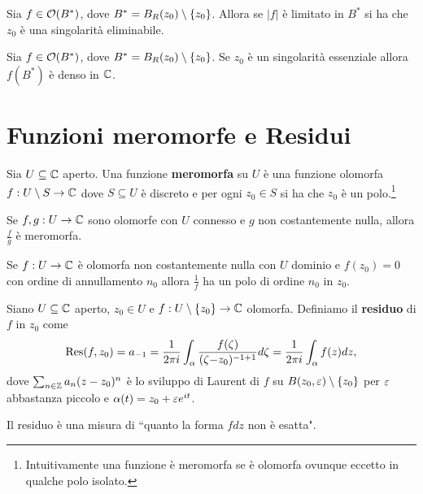 \begin{multicols*}{2}
\begin{theorem}\label{TeoremaEstensioneRiemann}
Sia $f\in \mathcal{O}(B^\ast)$, dove $B^\ast=B_R(z_0)\setminus\{z_0\}$. Allora se $|f|$ \`e limitato in $B^\ast$ si ha che $z_0$ \`e una singolarit\`a eliminabile.
\end{theorem}

\begin{theorem}\label{TeoremaCasoratiWeierstrass}
Sia $f\in \mathcal{O}(B^\ast)$, dove $B^\ast=B_R(z_0)\setminus\{z_0\}$. Se $z_0$ \`e un singolarit\`a essenziale allora $f(B^\ast)$ \`e denso in $\mathbb{C}$.
\end{theorem}


\section{Funzioni meromorfe e Residui}
\begin{definition}
Sia $U\subseteq \mathbb{C}$ aperto. Una funzione \textbf{meromorfa} su $U$ \`e una funzione olomorfa $f:U\setminus S\to \mathbb{C}$ dove $S\subseteq U$ \`e discreto e per ogni $z_0\in S$ si ha che $z_0$ \`e un polo.\footnote{Intuitivamente una funzione \`e meromorfa se \`e olomorfa ovunque eccetto in qualche polo isolato.}
\end{definition}

\begin{remark}
Se $f,g:U\to\mathbb{C}$ sono olomorfe con $U$ connesso e $g$ non costantemente nulla, allora $\frac fg$ \`e meromorfa.
\end{remark}

\begin{remark}
Se $f:U\to \mathbb{C}$ \`e olomorfa non costantemente nulla con $U$ dominio e $f(z_0)=0$ con ordine di annullamento $n_0$ allora $\frac1{f}$ ha un polo di ordine $n_0$ in $z_0$.
\end{remark}

\begin{definition}[Residuo]
Siano $U\subseteq \mathbb{C}$ aperto, $z_0\in U$ e $f:U\setminus \{z_0\}\to \mathbb{C}$ olomorfa. Definiamo il \textbf{residuo} di $f$ in $z_0$ come
\[\Res(f,z_0)=a_{-1}=\cauchyint[-1+1]{\al}=\frac1{2\pi i}\int_\al f(z)dz,\]
dove $\sum_{n\in\mathbb{Z}}a_n(z-z_0)^n$ \`e lo sviluppo di Laurent di $f$ su $B(z_0,\varepsilon)\setminus\{z_0\}$ per $\varepsilon$ abbastanza piccolo e $\alpha(t)=z_0+\varepsilon e^{it}$.
\end{definition}
\begin{remark}
Il residuo \`e una misura di   ``quanto la forma $fdz$ non \`e esatta".
\end{remark}




\end{multicols*}
